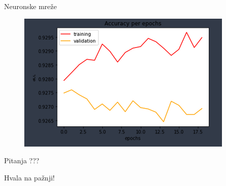 \documentclass{beamer}
\begin{document}
\begin{frame}[fragile]{Neuronske mre\v{z}e}
    \begin{figure}[!h]
    \centering
    \includegraphics[scale=0.9]{acc.PNG}
    \end{figure}
\end{frame}

\begin{frame}{Pitanja}
    \centering
    ???
\end{frame}

\begin{frame}
    \centering
    Hvala na pa\v{z}nji!
\end{frame}
\end{document}
